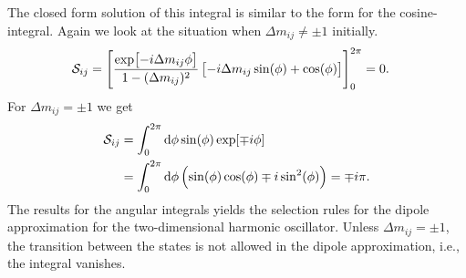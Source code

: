             The closed form solution of this integral is similar to the form for
            the cosine-integral.
            Again we look at the situation when $\Delta m_{ij} \neq \pm 1$
            initially.
            \begin{align}
                \mathcal{S}_{ij}
                &= \left[ 
                    \frac{\exp[-i\Delta m_{ij} \phi]}{1 - (\Delta m_{ij})^2}
                    \left[ 
                        -i\Delta m_{ij} \sin(\phi)
                        + \cos(\phi)
                     \right]
                 \right]_{0}^{2\pi}
                = 0.
                \label{eq:dipole-y-tdqd}
            \end{align}
            For $\Delta m_{ij} = \pm 1$ we get
            \begin{align}
                \mathcal{S}_{ij}
                &=
                \int_{0}^{2\pi}
                \dd\phi
                \sin(\phi)
                \exp[\mp i\phi]
                \\
                &=
                \int_{0}^{2\pi}
                \dd\phi
                \left( 
                    \sin(\phi)\cos(\phi)
                    \mp i\sin^2(\phi)
                 \right)
                = \mp i\pi.
            \end{align}
            The results for the angular integrals yields the selection rules for
            the dipole approximation for the two-dimensional harmonic
            oscillator.
            Unless $\Delta m_{ij} = \pm 1$, the transition between the states is
            not allowed in the dipole approximation, i.e., the integral
            vanishes.


